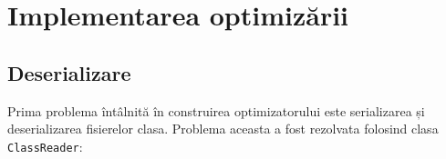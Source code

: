 \chapter{Implementarea optimizării}

\section{Deserializare}\label{deserializare}

Prima problema întâlnită în construirea optimizatorului este
serializarea și deserializarea fisierelor clasa. Problema aceasta
a fost rezolvata folosind clasa \texttt{ClassReader}:




